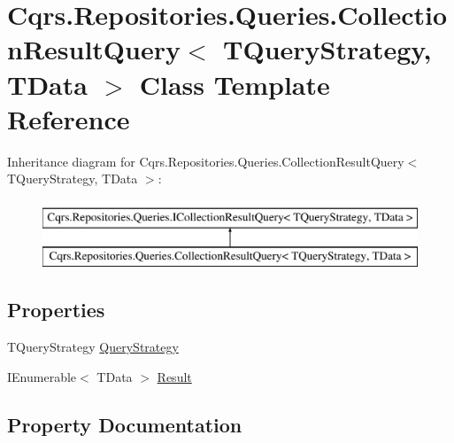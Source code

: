\hypertarget{classCqrs_1_1Repositories_1_1Queries_1_1CollectionResultQuery}{}\section{Cqrs.\+Repositories.\+Queries.\+Collection\+Result\+Query$<$ T\+Query\+Strategy, T\+Data $>$ Class Template Reference}
\label{classCqrs_1_1Repositories_1_1Queries_1_1CollectionResultQuery}
Inheritance diagram for Cqrs.\+Repositories.\+Queries.\+Collection\+Result\+Query$<$ T\+Query\+Strategy, T\+Data $>$\+:\begin{figure}[H]
\begin{center}
\leavevmode
\includegraphics[height=2.000000cm]{classCqrs_1_1Repositories_1_1Queries_1_1CollectionResultQuery}
\end{center}
\end{figure}
\subsection*{Properties}
\begin{DoxyCompactItemize}
\item 
T\+Query\+Strategy \hyperlink{classCqrs_1_1Repositories_1_1Queries_1_1CollectionResultQuery_a717d2ce71c0849008a96f80ba58cd032}{Query\+Strategy}
\item 
I\+Enumerable$<$ T\+Data $>$ \hyperlink{classCqrs_1_1Repositories_1_1Queries_1_1CollectionResultQuery_af2542c8b63668ddb39c2195c3280cd89}{Result}
\end{DoxyCompactItemize}


\subsection{Property Documentation}
\mbox{\label{classCqrs_1_1Repositories_1_1Queries_1_1CollectionResultQuery_a717d2ce71c0849008a96f80ba58cd032}} 
